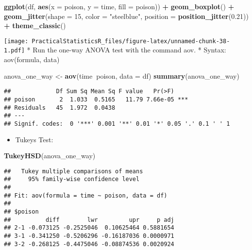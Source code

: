 \documentclass[]{article}
\newenvironment{Shaded}{\begin{snugshade}}{\end{snugshade}}
\newcommand{\DataTypeTok}[1]{\textcolor[rgb]{0.13,0.29,0.53}{#1}}
\newcommand{\DecValTok}[1]{\textcolor[rgb]{0.00,0.00,0.81}{#1}}
\newcommand{\FloatTok}[1]{\textcolor[rgb]{0.00,0.00,0.81}{#1}}
\newcommand{\KeywordTok}[1]{\textcolor[rgb]{0.13,0.29,0.53}{\textbf{#1}}}
\newcommand{\NormalTok}[1]{#1}
\newcommand{\OperatorTok}[1]{\textcolor[rgb]{0.81,0.36,0.00}{\textbf{#1}}}
\newcommand{\StringTok}[1]{\textcolor[rgb]{0.31,0.60,0.02}{#1}}
\providecommand{\tightlist}{%
  \setlength{\itemsep}{0pt}\setlength{\parskip}{0pt}}
\begin{document}
\begin{Shaded}
\begin{Highlighting}[]
\KeywordTok{ggplot}\NormalTok{(df, }\KeywordTok{aes}\NormalTok{(}\DataTypeTok{x =}\NormalTok{ poison, }\DataTypeTok{y =}\NormalTok{ time, }\DataTypeTok{fill =}\NormalTok{ poison)) }\OperatorTok{+}
\StringTok{    }\KeywordTok{geom_boxplot}\NormalTok{() }\OperatorTok{+}
\StringTok{    }\KeywordTok{geom_jitter}\NormalTok{(}\DataTypeTok{shape =} \DecValTok{15}\NormalTok{,}
        \DataTypeTok{color =} \StringTok{"steelblue"}\NormalTok{,}
        \DataTypeTok{position =} \KeywordTok{position_jitter}\NormalTok{(}\FloatTok{0.21}\NormalTok{)) }\OperatorTok{+}
\StringTok{    }\KeywordTok{theme_classic}\NormalTok{()}
\end{Highlighting}
\end{Shaded}

\texttt{[image: PracticalStatisticsR\_files/figure-latex/unnamed-chunk-38-1.pdf]}
* Run the one-way ANOVA test with the command aov. * Syntax:
aov(formula, data)

\begin{Shaded}
\begin{Highlighting}[]
\NormalTok{anova_one_way <-}\StringTok{ }\KeywordTok{aov}\NormalTok{(time}\OperatorTok{~}\NormalTok{poison, }\DataTypeTok{data =}\NormalTok{ df)}
\KeywordTok{summary}\NormalTok{(anova_one_way)}
\end{Highlighting}
\end{Shaded}

\begin{verbatim}
##             Df Sum Sq Mean Sq F value   Pr(>F)    
## poison       2  1.033  0.5165   11.79 7.66e-05 ***
## Residuals   45  1.972  0.0438                     
## ---
## Signif. codes:  0 '***' 0.001 '**' 0.01 '*' 0.05 '.' 0.1 ' ' 1
\end{verbatim}

\begin{itemize}
\tightlist
\item
  Tukeys Test:
\end{itemize}

\begin{Shaded}
\begin{Highlighting}[]
\KeywordTok{TukeyHSD}\NormalTok{(anova_one_way)}
\end{Highlighting}
\end{Shaded}

\begin{verbatim}
##   Tukey multiple comparisons of means
##     95% family-wise confidence level
## 
## Fit: aov(formula = time ~ poison, data = df)
## 
## $poison
##          diff        lwr         upr     p adj
## 2-1 -0.073125 -0.2525046  0.10625464 0.5881654
## 3-1 -0.341250 -0.5206296 -0.16187036 0.0000971
## 3-2 -0.268125 -0.4475046 -0.08874536 0.0020924
\end{verbatim}
\end{document}
